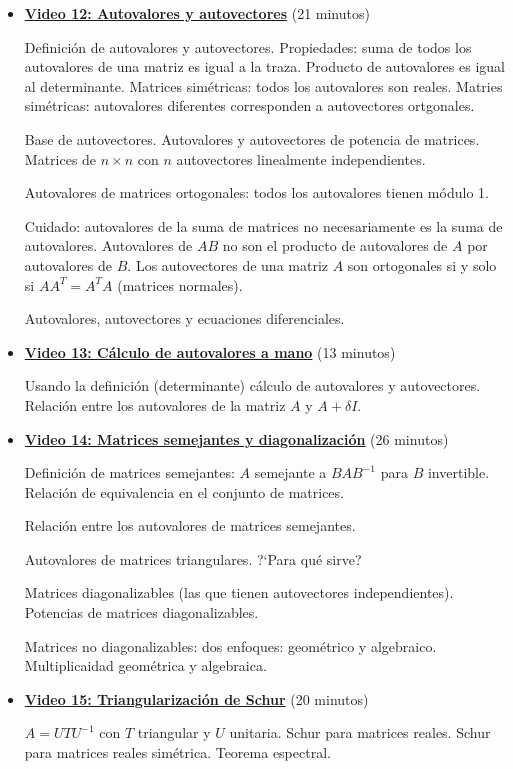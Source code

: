 \documentclass[12pt,a4paper]{article}
\newcommand\1{\mbox{\,\vrule height-0.8pt depth1.0pt width2pc\,}}
\newcommand\2{\mbox{\,\vrule height-0.8pt depth1.0pt width1pc\,}}
\begin{document}
\begin{itemize}
    \item \href{https://youtu.be/WTG1rsEQEIU}{\bf Video 12: Autovalores y autovectores} (21 minutos)
    
    
    
    Definici\'on de autovalores y autovectores. Propiedades: suma de todos los autovalores de una matriz es igual a la traza. Producto de autovalores es igual al determinante. Matrices simétricas: todos los autovalores son reales. Matries simétricas: autovalores diferentes corresponden a autovectores ortgonales. 
    
    Base de autovectores. Autovalores y autovectores de potencia de matrices. Matrices de $n\times n$ con $n$ autovectores linealmente independientes. 
    
    Autovalores de matrices ortogonales: todos los autovalores tienen m\'odulo 1.
    
    Cuidado: autovalores de la suma de matrices no necesariamente es la suma de autovalores. Autovalores de $AB$ no son el producto de autovalores de $A$ por autovalores de $B$. Los autovectores de una matriz $A$ son ortogonales si y solo si $AA^T=A^T A $ (matrices normales).
    
    Autovalores, autovectores y ecuaciones diferenciales. 
    
    
    
    
    
    
    \item \href{https://youtu.be/RYye5mbDPoQ}{\bf Video 13: C\'alculo de autovalores a mano}
    (13 minutos)
    
    Usando la definici\'on (determinante) c\'alculo de autovalores y autovectores. Relaci\'on entre los autovalores de la matriz $A$ y $A + \delta I$. 
    
    
    \item \href{https://youtu.be/fxE84IVKss4}{\bf Video 14: Matrices semejantes y diagonalización} (26 minutos)
    
    
    Definici\'on de matrices semejantes: $ A$ semejante a $B AB^{-1}$ para $B $ invertible. Relaci\'on de equivalencia en el conjunto de matrices. 
    
    Relaci\'on entre los autovalores de matrices semejantes.
    
    Autovalores de matrices triangulares. ?`Para qu\'e sirve?
    
    Matrices diagonalizables (las que tienen autovectores independientes). Potencias de matrices diagonalizables. 
    
    Matrices no diagonalizables: dos enfoques: geom\'etrico y algebraico. Multiplicaidad geom\'etrica y algebraica.



\item \href{https://youtu.be/TOZZPyvzpqU}{\bf Video 15: Triangularizaci\'on de Schur} (20 minutos)

$A= U T U^{-1}$ con $T $ triangular y $U$ unitaria. Schur para matrices reales. Schur para matrices reales sim\'etrica. Teorema espectral.



\end{itemize}
\end{document}
